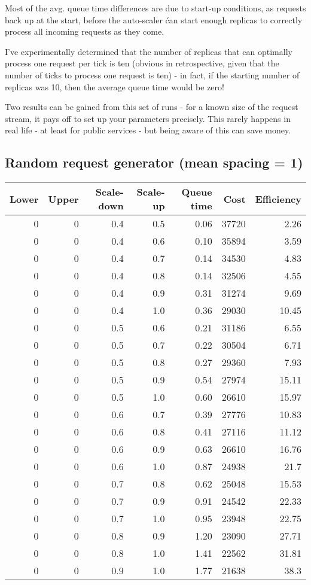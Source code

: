 \documentclass{scrartcl}
\begin{document}
Most of the avg. queue time differences are due to start-up conditions, as
requests back up at the start, before the auto-scaler ćan start enough replicas
to correctly process all incoming requests as they come.

I've experimentally determined that the number of replicas that can optimally
process one request per tick is ten (obvious in retrospective, given that the
number of ticks to process one request is ten) - in fact, if the starting number
of replicas was 10, then the average queue time would be zero!

Two results can be gained from this set of runs - for a known size of the
request stream, it pays off to set up your parameters precisely. This rarely
happens in real life - at least for public services - but being aware of this
can save money.


\subsection{Random request generator (mean spacing = 1)}
\label{sec-5-2}
\begin{center}
\begin{tabular}{rrrrrrr}
Lower & Upper & Scale-down & Scale-up & Queue time & Cost & Efficiency\\
\hline
0 & 0 & 0.4 & 0.5 & 0.06 & 37720 & 2.26\\
0 & 0 & 0.4 & 0.6 & 0.10 & 35894 & 3.59\\
0 & 0 & 0.4 & 0.7 & 0.14 & 34530 & 4.83\\
0 & 0 & 0.4 & 0.8 & 0.14 & 32506 & 4.55\\
0 & 0 & 0.4 & 0.9 & 0.31 & 31274 & 9.69\\
0 & 0 & 0.4 & 1.0 & 0.36 & 29030 & 10.45\\
0 & 0 & 0.5 & 0.6 & 0.21 & 31186 & 6.55\\
0 & 0 & 0.5 & 0.7 & 0.22 & 30504 & 6.71\\
0 & 0 & 0.5 & 0.8 & 0.27 & 29360 & 7.93\\
0 & 0 & 0.5 & 0.9 & 0.54 & 27974 & 15.11\\
0 & 0 & 0.5 & 1.0 & 0.60 & 26610 & 15.97\\
0 & 0 & 0.6 & 0.7 & 0.39 & 27776 & 10.83\\
0 & 0 & 0.6 & 0.8 & 0.41 & 27116 & 11.12\\
0 & 0 & 0.6 & 0.9 & 0.63 & 26610 & 16.76\\
0 & 0 & 0.6 & 1.0 & 0.87 & 24938 & 21.7\\
0 & 0 & 0.7 & 0.8 & 0.62 & 25048 & 15.53\\
0 & 0 & 0.7 & 0.9 & 0.91 & 24542 & 22.33\\
0 & 0 & 0.7 & 1.0 & 0.95 & 23948 & 22.75\\
0 & 0 & 0.8 & 0.9 & 1.20 & 23090 & 27.71\\
0 & 0 & 0.8 & 1.0 & 1.41 & 22562 & 31.81\\
0 & 0 & 0.9 & 1.0 & 1.77 & 21638 & 38.3\\
\end{tabular}
\end{center}
\end{document}
